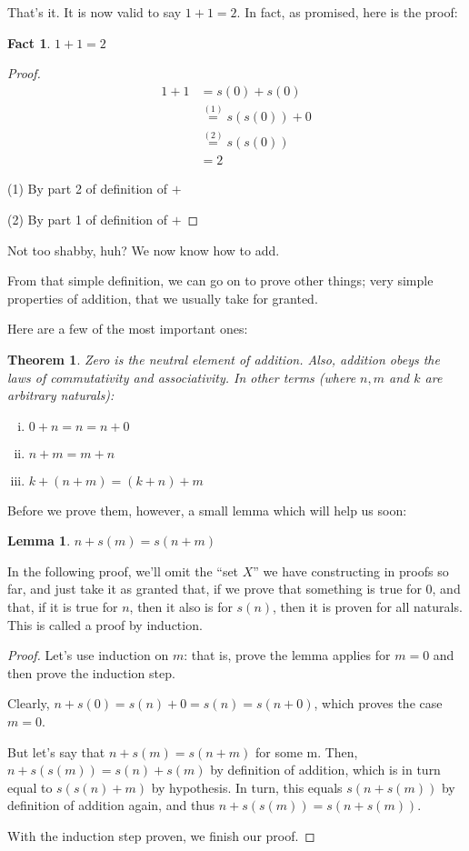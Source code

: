 \documentclass[12pt,a4paper]{article}
\theoremstyle{definition}
\theoremstyle{definition}
\theoremstyle{plain}
\newtheorem{theorem}{Theorem}
\theoremstyle{plain}
\newtheorem*{fact}{Fact}
\newtheorem{lemma}{Lemma}
\begin{document}
	That's it. It is now valid to say $1+1=2$. In fact, as promised, here is the proof:
	
	\begin{fact}
		$1+1=2$
	\end{fact}
	
	\begin{proof}
		\begin{align*}
			1 + 1 &= s(0) + s(0) \\
				  &\overset{(1)}{=} s(s(0)) + 0 \\
				  &\overset{(2)}{=} s(s(0)) \\
				  &= 2
		\end{align*}
		
		(1) By part 2 of definition of $+$
		
		(2) By part 1 of definition of $+$
	\end{proof}
	
	Not too shabby, huh? We now know how to add.
	
	From that simple definition, we can go on to prove other things; very simple properties of addition, that we usually take for granted.
	
	Here are a few of the most important ones:
	
	\begin{theorem}
		Zero is the neutral element of addition. Also, addition obeys the laws of commutativity and associativity. In other terms (where $n,m$ and $k$ are arbitrary naturals):
		\begin{enumerate}[i.]
			\item $0 + n = n = n + 0$
			\item $n + m = m + n$
			\item $k + (n + m) = (k + n) + m$
		\end{enumerate}
	\end{theorem}
	
	Before we prove them, however, a small lemma which will help us soon:
	
	\begin{lemma}
		$n+s(m) = s(n+m)$
	\end{lemma}
	
	In the following proof, we'll omit the ``set $X$'' we have constructing in proofs so far, and just take it as granted that, if we prove that something is true for 0, and that, if it is true for $n$, then it also is for $s(n)$, then it is proven for all naturals. This is called a proof by induction.
	
	\begin{proof}
		Let's use induction on $m$: that is, prove the lemma applies for $m=0$ and then prove the induction step.
		
		Clearly, $n+s(0) = s(n) + 0 = s(n) = s(n+0)$, which proves the case $m=0$.
		
		But let's say that $n+s(m)=s(n+m)$ for some m. Then, $n+s(s(m)) = s(n) + s(m)$ by definition of addition, which is in turn equal to $s(s(n)+m)$ by hypothesis. In turn, this equals $s(n + s(m))$ by definition of addition again, and thus $n + s(s(m)) = s(n+s(m))$.
		
		With the induction step proven, we finish our proof.
	\end{proof}
	
\end{document}
